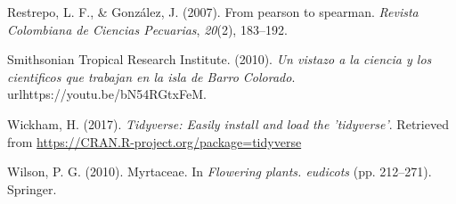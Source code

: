 \documentclass[11pt,]{article}
\begin{document}
\hypertarget{ref-restrepo2007pearson}{}
Restrepo, L. F., \& González, J. (2007). From pearson to spearman.
\emph{Revista Colombiana de Ciencias Pecuarias}, \emph{20}(2), 183--192.

\hypertarget{ref-bci_video}{}
Smithsonian Tropical Research Institute. (2010). \emph{Un vistazo a la
ciencia y los cientificos que trabajan en la isla de Barro Colorado}.
urlhttps://youtu.be/bN54RGtxFeM.

\hypertarget{ref-tidyverse}{}
Wickham, H. (2017). \emph{Tidyverse: Easily install and load the
'tidyverse'}. Retrieved from
\url{https://CRAN.R-project.org/package=tidyverse}

\hypertarget{ref-wilson2010myrtaceae}{}
Wilson, P. G. (2010). Myrtaceae. In \emph{Flowering plants. eudicots}
(pp. 212--271). Springer.




\newpage
\singlespacing 
\end{document}
